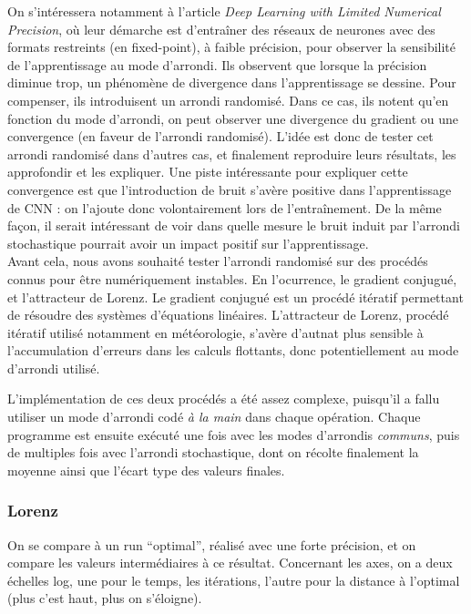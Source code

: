 \documentclass[a4paper,11pt]{article}
\begin{document}
On s'intéressera notamment à l'article \textit{Deep Learning with Limited Numerical Precision}\cite{gupta2015deep}, où leur démarche est d'entraîner des réseaux de neurones avec des formats restreints (en fixed-point), à faible précision, pour observer la sensibilité de l’apprentissage au mode d’arrondi.
Ils observent que lorsque la précision diminue trop, un phénomène de divergence dans l'apprentissage se dessine. Pour compenser, ils introduisent un arrondi randomisé.
Dans ce cas, ils notent qu'en fonction du mode d'arrondi, on peut observer une divergence du gradient ou une convergence (en faveur de l'arrondi randomisé).
L’idée est donc de tester cet arrondi randomisé dans d’autres cas, et finalement reproduire leurs résultats, les approfondir et les expliquer.
Une piste intéressante pour expliquer cette convergence est que l’introduction de bruit s’avère positive dans l’apprentissage de CNN : on l’ajoute donc volontairement lors de l’entraînement. De la même façon, il serait intéressant de voir dans quelle mesure le bruit induit par l’arrondi stochastique pourrait avoir un impact positif sur l’apprentissage.
\\
Avant cela, nous avons souhaité tester l’arrondi randomisé sur des procédés connus pour être numériquement instables. En l'ocurrence, le gradient conjugué, et l'attracteur de Lorenz. Le gradient conjugué est un procédé itératif permettant de résoudre des systèmes d’équations linéaires\cite{shewchuk1994introduction}.
L'attracteur de Lorenz, procédé itératif utilisé notamment en météorologie, s'avère d'autnat plus sensible à l'accumulation d'erreurs dans les calculs flottants, donc potentiellement au mode d’arrondi utilisé.

L’implémentation de ces deux procédés a été assez complexe, puisqu’il a fallu utiliser un mode d’arrondi codé \textit{à la main} dans chaque opération.
Chaque programme est ensuite exécuté une fois avec les modes d'arrondis \textit{communs}, puis de multiples fois avec l'arrondi stochastique, dont on récolte finalement la moyenne ainsi que l'écart type des valeurs finales.

\subsubsection{Lorenz}
On se compare à un run “optimal”, réalisé avec une forte précision, et on compare les valeurs intermédiaires à ce résultat.
Concernant les axes, on a deux échelles log, une pour le temps, les itérations, l’autre pour la distance à l’optimal (plus c’est haut, plus on s’éloigne).
\end{document}
